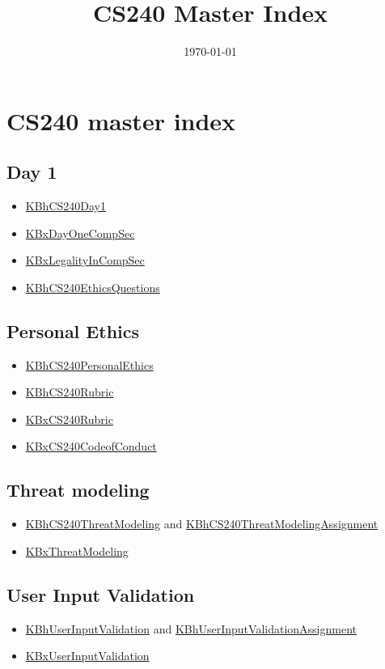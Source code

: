 \documentclass[letterpaper]{article}
\date{\today}
\title{CS240 Master Index}
\renewcommand{\tableofcontents}{}
\begin{document}
\tableofcontents



\section{CS240 master index}
\label{sec:org71a46bd}
\subsection{Day 1}
\label{sec:org2faaf16}
\begin{itemize}
\item \href{KBhCS240Day1.org}{KBhCS240Day1}
\item \href{KBxDayOneCompSec.org}{KBxDayOneCompSec}
\item \href{KBxLegalityInCompSec.org}{KBxLegalityInCompSec}
\item \href{KBhCS240EthicsQuestions.org}{KBhCS240EthicsQuestions}
\end{itemize}

\subsection{Personal Ethics}
\label{sec:orge92a399}
\begin{itemize}
\item \href{KBhCS240PersonalEthics.org}{KBhCS240PersonalEthics}
\item \href{KBhCS240Rubric.org}{KBhCS240Rubric}
\item \href{KBxCS240Rubric.org}{KBxCS240Rubric}
\item \href{KBxCS240CodeofConduct.org}{KBxCS240CodeofConduct}
\end{itemize}

\subsection{Threat modeling}
\label{sec:org393d3d9}
\begin{itemize}
\item \href{KBhCS240ThreatModeling.org}{KBhCS240ThreatModeling} and
\href{KBhCS240ThreatModelingAssignment.org}{KBhCS240ThreatModelingAssignment}
\item \href{KBxThreatModeling.org}{KBxThreatModeling}
\end{itemize}

\subsection{User Input Validation}
\label{sec:org1171fc7}
\begin{itemize}
\item \href{KBhUserInputValidation.org}{KBhUserInputValidation} and
\href{KBhUserInputValidationAssignment.org}{KBhUserInputValidationAssignment}
\item \href{KBxUserInputValidation.org}{KBxUserInputValidation}
\end{itemize}
\end{document}
